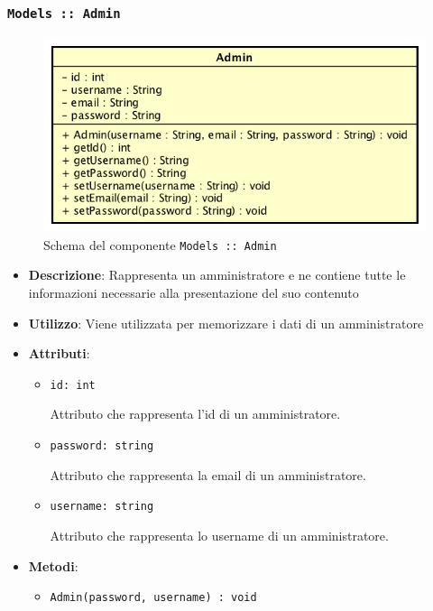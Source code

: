 \documentclass[../DefinizioneDiProdotto.tex]{subfiles}
\begin{document}
\begin{itemize}
	\subsubsection{\texttt{Models :: Admin}}
	\begin{figure}[!h]
		\centering
		\includegraphics[scale=0.7]{Architettura/Models/Admin.png}
		\caption{Schema del componente \texttt{Models :: Admin}}
	\end{figure}
	\begin{itemize}\item \textbf{Descrizione}: Rappresenta un amministratore e ne contiene tutte le informazioni necessarie alla presentazione del suo contenuto
	\item \textbf{Utilizzo}: Viene utilizzata per memorizzare i dati di un amministratore
	\item \textbf{Attributi}:
	\begin{itemize}
	\item \texttt{id: int}\

	 Attributo che rappresenta l'id di un amministratore.
	\end{itemize}
	\begin{itemize}
	\item \texttt{password: string}\

	 Attributo che rappresenta la email di un amministratore.
	\end{itemize}
	\begin{itemize}
	\item \texttt{username: string}\

	 Attributo che rappresenta lo username di un amministratore.
	\end{itemize}
	\item \textbf{Metodi}:
	\begin{itemize}
	\item \texttt{Admin(password, username) : void}\


\end{itemize}
\end{itemize}
\end{itemize}
\end{document}
